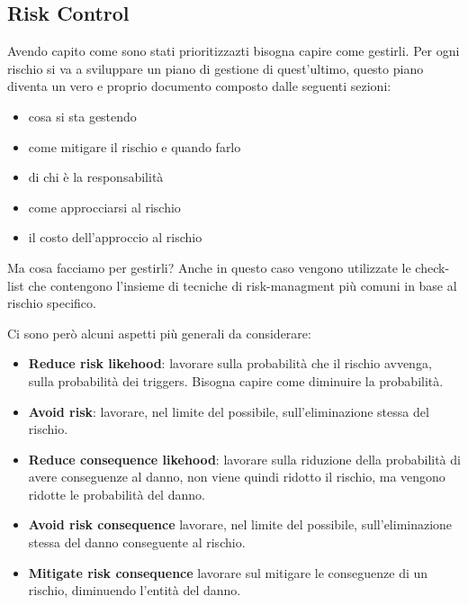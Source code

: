 \subsection{Risk Control}
Avendo capito come sono stati prioritizzazti bisogna capire come gestirli.
Per ogni rischio si va a sviluppare un piano di gestione di quest'ultimo, questo piano diventa un vero e proprio documento composto dalle seguenti sezioni:
\begin{itemize}
    \item cosa si sta gestendo 
    \item come mitigare il rischio e quando farlo
    \item di chi è la responsabilità
    \item come approcciarsi al rischio
    \item il costo dell'approccio al rischio
\end{itemize}
Ma cosa facciamo per gestirli? Anche in questo caso vengono utilizzate le check-list che contengono l'insieme di tecniche di risk-managment più comuni in base al rischio specifico. 

Ci sono però alcuni aspetti più generali da considerare:
    \begin{itemize}
      \item \textbf{Reduce risk likehood}: lavorare sulla probabilità che il rischio avvenga, sulla probabilità dei  triggers. Bisogna capire come diminuire la probabilità.
      \item \textbf{Avoid risk}: lavorare, nel limite del possibile, sull'eliminazione stessa del rischio.
      \item \textbf{Reduce consequence likehood}: lavorare sulla riduzione della probabilità di avere conseguenze al danno, non viene quindi ridotto il rischio, ma vengono ridotte le probabilità del danno.
      \item \textbf{Avoid risk consequence} lavorare, nel limite del possibile, sull'eliminazione stessa del danno conseguente al rischio.
      \item \textbf{Mitigate risk consequence} lavorare sul mitigare le conseguenze di un rischio, diminuendo l'entità
      del danno.
    \end{itemize}
    
